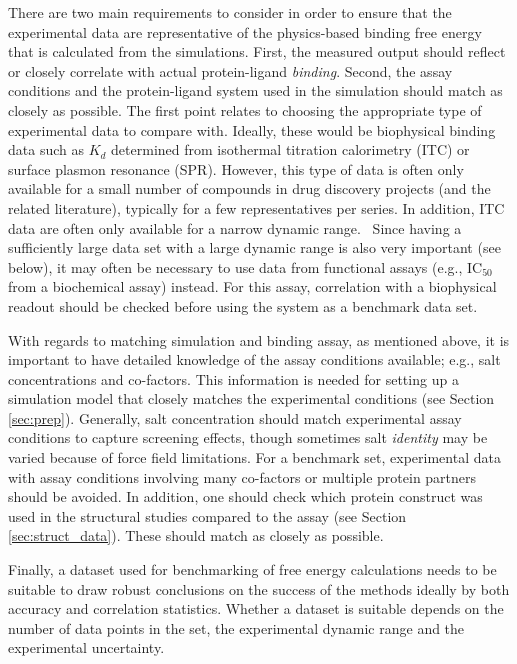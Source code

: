 \documentclass[9pt,bestpractices]{livecoms}
\begin{document}
There are two main requirements to consider in order to ensure that the experimental data are representative of the physics-based binding free energy that is calculated from the simulations. First, the measured output should reflect or closely correlate with actual protein-ligand \emph{binding}. Second, the assay conditions and the protein-ligand system used in the simulation should match as closely as possible. The first point relates to choosing the appropriate type of experimental data to compare with. Ideally, these would be biophysical binding data such as $K_d$ determined from isothermal titration calorimetry (ITC) or surface plasmon resonance (SPR). However, this type of data is often only available for a small number of compounds in drug discovery projects (and the related literature), typically for a few representatives per series. In addition, ITC data are often only available for a narrow dynamic range.~\cite{wiseman_rapid_1989,chodera_entropyenthalpy_2013} Since having a sufficiently large data set with a large dynamic range is also very important (see below), it may often be necessary to use data from functional assays (e.g., IC$_{50}$ from a biochemical assay) instead. For this assay, correlation with a biophysical readout should be checked before using the system as a benchmark data set.\cite{kalliokoski_comparability_2013}

With regards to matching simulation and binding assay, as mentioned above, it is important to have detailed knowledge of the assay conditions available; e.g., salt concentrations and co-factors. This information is needed for setting up a simulation model that closely matches the experimental conditions (see Section \ref{sec:prep}). Generally, salt concentration should match experimental assay conditions to capture screening effects, though sometimes salt \emph{identity} may be varied because of force field limitations. For a benchmark set, experimental data with assay conditions involving many co-factors or multiple protein partners should be avoided. In addition, one should check which protein construct was used in the structural studies compared to the assay (see Section \ref{sec:struct_data}). These should match as closely as possible. 

Finally, a dataset used for benchmarking of free energy calculations needs to be suitable to draw robust conclusions on the success of the methods ideally by both accuracy and correlation statistics. Whether a dataset is suitable depends on the number of data points in the set, the experimental dynamic range and the experimental uncertainty. 
\end{document}
